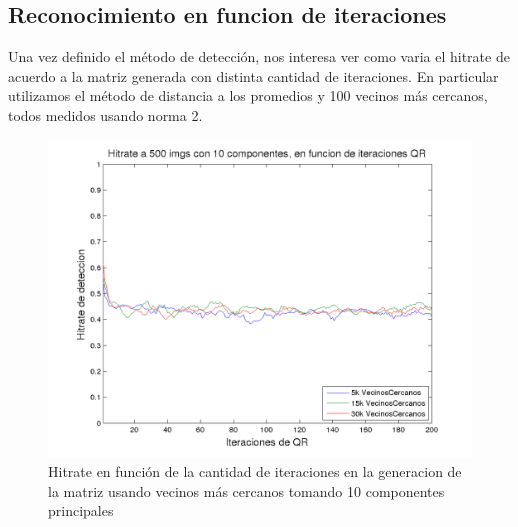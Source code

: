 
\subsection{Reconocimiento en funcion de iteraciones}
Una vez definido el m\'etodo de detecci\'on, nos interesa ver como varia el hitrate
de acuerdo a la matriz generada con distinta cantidad de iteraciones. En particular
utilizamos el m\'etodo de distancia a los promedios y 100 vecinos m\'as cercanos, todos
medidos usando norma 2.

\begin{figure}[H]
\begin {center}
\includegraphics[width=\hrwidth]{plots/HR_10_0.png}
\end {center}
\caption{Hitrate en funci\'on de la cantidad de iteraciones en la generacion de la matriz
usando vecinos m\'as cercanos tomando 10 componentes principales}
\label{fig:HR10Neig}
\end{figure}


